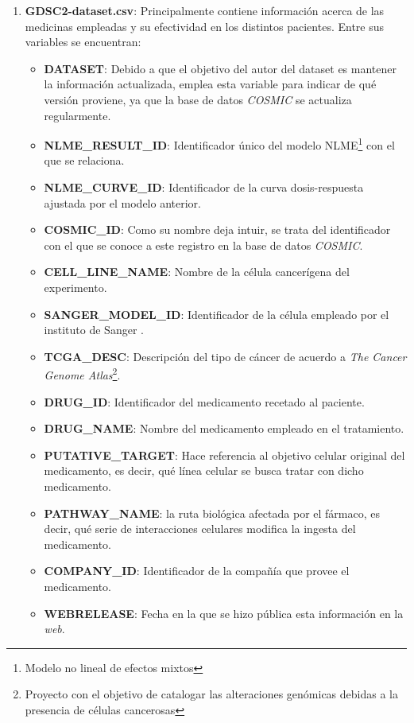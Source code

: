 \begin{enumerate}
    \item \textbf{GDSC2-dataset.csv}: Principalmente contiene información acerca de las medicinas empleadas y su efectividad en los distintos pacientes. Entre sus variables se encuentran:
    \begin{itemize}
        \item \textbf{DATASET}: Debido a que el objetivo del autor del dataset es mantener la información actualizada, emplea esta variable para indicar de qué versión proviene, ya que la base de datos \textit{COSMIC} se actualiza regularmente.
        \item \textbf{NLME\_RESULT\_ID}: Identificador único del modelo NLME\footnote{Modelo no lineal de efectos mixtos} con el que se relaciona.
        \item \textbf{NLME\_CURVE\_ID}: Identificador de la curva dosis-respuesta ajustada por el modelo anterior.
        \item \textbf{COSMIC\_ID}: Como su nombre deja intuir, se trata del identificador con el que se conoce a este registro en la base de datos \textit{COSMIC}.
        \item \textbf{CELL\_LINE\_NAME}: Nombre de la célula cancerígena del experimento.
        \item \textbf{SANGER\_MODEL\_ID}: Identificador de la célula empleado por el instituto de Sanger \cite{sanger}.
        \item \textbf{TCGA\_DESC}: Descripción del tipo de cáncer de acuerdo a \textit{The Cancer Genome Atlas}\footnote{Proyecto con el objetivo de catalogar las alteraciones genómicas debidas a la presencia de células cancerosas}.
        \item \textbf{DRUG\_ID}: Identificador del medicamento recetado al paciente.
        \item \textbf{DRUG\_NAME}: Nombre del medicamento empleado en el tratamiento.
        \item \textbf{PUTATIVE\_TARGET}: Hace referencia al objetivo celular original del medicamento, es decir, qué línea celular se busca tratar con dicho medicamento.
        \item \textbf{PATHWAY\_NAME}: la ruta biológica afectada por el fármaco, es decir, qué serie de interacciones celulares modifica la ingesta del medicamento.
        \item \textbf{COMPANY\_ID}: Identificador de la compañía que provee el medicamento.
        \item \textbf{WEBRELEASE}: Fecha en la que se hizo pública esta información en la \textit{web}.

\end{itemize}
\end{enumerate}
